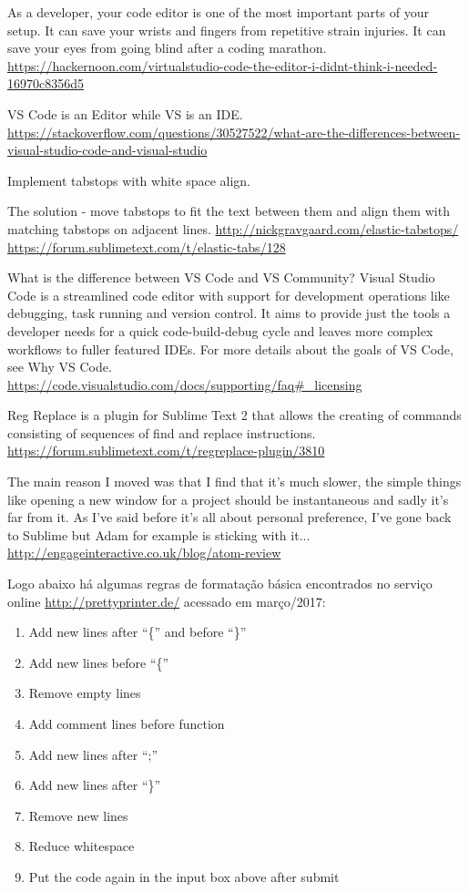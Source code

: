 {    As a developer, your code editor is one of the most important parts of your setup. It can save
    your wrists and fingers from repetitive strain injuries. It can save your eyes from going blind
    after a coding marathon.
    \url{https://hackernoon.com/virtualstudio-code-the-editor-i-didnt-think-i-needed-16970c8356d5}

    VS Code is an Editor while VS is an IDE.
    \url{https://stackoverflow.com/questions/30527522/what-are-the-differences-between-visual-studio-code-and-visual-studio}

    Implement tabstops with white space align.

    The solution - move tabstops to fit the text between them and align them with matching tabstops
    on adjacent lines.
    \url{http://nickgravgaard.com/elastic-tabstops/}
    \url{https://forum.sublimetext.com/t/elastic-tabs/128}

    What is the difference between VS Code and VS Community?
    Visual Studio Code is a streamlined code editor with support for development operations like
    debugging, task running and version control. It aims to provide just the tools a developer needs
    for a quick code-build-debug cycle and leaves more complex workflows to fuller featured IDEs.
    For more details about the goals of VS Code, see Why VS Code.
    \url{https://code.visualstudio.com/docs/supporting/faq#_licensing}

    Reg Replace is a plugin for Sublime Text 2 that allows the creating of commands consisting of
    sequences of find and replace instructions.
    \url{https://forum.sublimetext.com/t/regreplace-plugin/3810}

    The main reason I moved was that I find that it’s much slower, the simple things like opening a
    new window for a project should be instantaneous and sadly it’s far from it. As I've said before
    it's all about personal preference, I've gone back to Sublime but Adam for example is sticking
    with it...
    \url{http://engageinteractive.co.uk/blog/atom-review}

    Logo abaixo há algumas regras de formatação básica encontrados no serviço online
    \url{http://prettyprinter.de/} acessado em março/2017:

    \medskip
    \begin{myquote}
    \begin{enumerate}[nolistsep]
        \item Add new lines after ``\{'' and before ``\}''
        \item Add new lines before ``\{''
        \item Remove empty lines
        \item Add comment lines before function
        \item Add new lines after ``;''
        \item Add new lines after ``\}''
        \item Remove new lines
        \item Reduce whitespace
        \item Put the code again in the input box above after submit
    \end{enumerate}
    \end{myquote}

}
